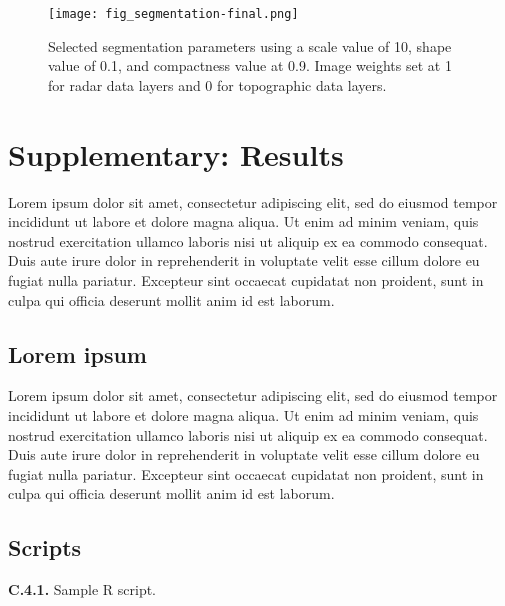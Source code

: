 \begin{appendices}
\begin{figure}
	\centering
	\texttt{[image: fig\_segmentation-final.png]}
	\caption[Images of selected segmentation parameters.]{Selected segmentation parameters using a scale value of 10, shape value of 0.1, and compactness value at 0.9. Image weights set at 1 for radar data layers and 0 for topographic data layers.}
	\label{fig: appendix-fig.b2}
\end{figure}


\chapter{Supplementary: Results}
\label{sup: supplementary-results}

Lorem ipsum dolor sit amet, consectetur adipiscing elit, sed do eiusmod tempor incididunt ut labore et dolore magna aliqua. Ut enim ad minim veniam, quis nostrud exercitation ullamco laboris nisi ut aliquip ex ea commodo consequat. Duis aute irure dolor in reprehenderit in voluptate velit esse cillum dolore eu fugiat nulla pariatur. Excepteur sint occaecat cupidatat non proident, sunt in culpa qui officia deserunt mollit anim id est laborum.
\newpage

\section{Lorem ipsum}
\label{app: appendix-lorem-ipsum}

Lorem ipsum dolor sit amet, consectetur adipiscing elit, sed do eiusmod tempor incididunt ut labore et dolore magna aliqua. Ut enim ad minim veniam, quis nostrud exercitation ullamco laboris nisi ut aliquip ex ea commodo consequat. Duis aute irure dolor in reprehenderit in voluptate velit esse cillum dolore eu fugiat nulla pariatur. Excepteur sint occaecat cupidatat non proident, sunt in culpa qui officia deserunt mollit anim id est laborum.

\section{Scripts}
\label{app: appendix-scripts}

\flushleft \textbf{C.4.1.} Sample R script.\\
\begin{singlespace}
	
\end{singlespace}
\newpage

\end{appendices}
